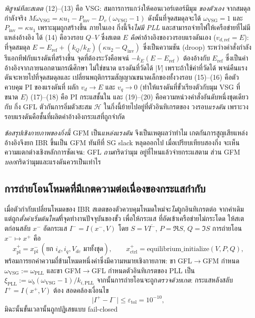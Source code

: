 \documentclass[12pt,a4paper]{article}
\begin{document}
\emph{พิสูจน์ทีละสเตต} (12)--(13) คือ VSG: สมการการแกว่งให้คอนเวอร์เตอร์มีมุม
\emph{ของตัวเอง} จากสมดุลกำลังจริง $M\dot\omega_{\mathrm{VSG}}
=\kappa u_1-P_{\mathrm{inv}}-D_v(\omega_{\mathrm{VSG}}-1)$ ดังนั้นที่จุดสมดุลจะได้
$\omega_{\mathrm{VSG}}=1$ และ $P_{\mathrm{inv}}=\kappa u_1$ เพราะมุมถูกสร้างขึ้น
ภายในเอง กิ่งนี้จึง\emph{ไม่มี PLL} และสามารถจ่ายไฟให้เครือข่ายที่ไม่มีแหล่งอ้างอิง
ได้ (14) คือวงรอบ $Q$--$V$ ซึ่งสเตต $E$ \emph{คือ}ค่าอ้างอิงของวงรอบแรงดันเอง
($v_{d,\mathrm{ref}}=E$): ที่จุดสมดุล $E=E_{\mathrm{ref}}
+(k_Q/k_E)(\kappa u_2-Q_{\mathrm{inv}})$ ซึ่งเป็นความชัน (droop) ระหว่างค่าสั่งกำลัง
รีแอกทีฟกับแรงดันที่สร้างขึ้น จุดที่ต้องระวังคือพจน์ $-k_E(E-E_{\mathrm{ref}})$
ต้องอ้างกับ $E_{\mathrm{ref}}$ ซึ่งเป็นค่าอ้างอิงจากภายนอกตามกรณีศึกษา ไม่ใช่ขนาด
แรงดันที่วัดได้ $|V|$ เพราะถ้าใช้ค่าที่วัดได้ พจน์คืนแรงดันจะหายไปที่จุดสมดุลและ
เปลี่ยนพฤติกรรมสัญญาณขนาดเล็กของทั้งวงรอบ (15)--(16) คือตัวควบคุม PI ของแรงดันที่
ผลัก $v_d\to E$ และ $v_q\to 0$ (ทำให้แรงดันที่ขั้วเรียงตัวกับมุม VSG ที่ขนาด $E$)
(17)--(18) คือ PI กระแสชั้นใน และ (19)--(20) คือความหน่วงคำสั่งอันดับหนึ่งชุดเดียวกับ
กิ่ง GFL ตัวกันการอิ่มตัวสะสม $\mathcal H$ ในกิ่งนี้ย้ายไปอยู่ที่ตัวอินทิเกรตของ
วงรอบ\emph{แรงดัน} เพราะวงรอบแรงดันคือชั้นที่ผลิตค่าอ้างอิงกระแสที่ถูกจำกัด

\emph{ข้อสรุปเชิงกายภาพของกิ่งนี้} GFM เป็น\emph{แหล่งแรงดัน} จึงเป็นเหตุผลว่าทำไม
เกตกันการสูญเสียแหล่งอ้างอิงจึงยก IBR ขึ้นเป็น GFM ทันทีที่ SG slack หลุดออกไป
เมื่อเปรียบเทียบสองกิ่ง จะเห็นความแตกต่างเชิงหลักการชัดเจน: GFL \emph{ถาม}กริดว่ามุม
อยู่ที่ไหนแล้วจ่ายกระแสตาม ส่วน GFM \emph{บอก}กริดว่ามุมและแรงดันควรเป็นเท่าไร

\subsection{การถ่ายโอนโหมดที่มีเกตความต่อเนื่องของกระแสกำกับ}\label{sec:transfer}
เมื่อตัวกำกับเปลี่ยนโหมดของ IBR สเตตของตัวควบคุมโหมดใหม่จะ\emph{ไม่}ถูกอินทิเกรตต่อ
จากค่าเดิม แต่ถูก\emph{ตั้งค่าเริ่มต้นใหม่}ที่จุดทำงานปัจจุบันของขั้ว เพื่อให้กระแส
ที่อัดเข้าเครือข่ายไม่กระโดด ให้สเตตก่อนสลับ $x^{-}$ อัดกระแส $I^{-}=I(x^{-},V)$
โดย $S=V\overline{I^{-}}$, $P=\Re S$, $Q=\Im S$ การถ่ายโอน $x^{-}\mapsto x^{+}$ คือ
\begin{equation}
  x^{+}_{\mathrm{pl}}=x^{-}_{\mathrm{pl}}\ (\text{ยก }i_d,i_q,V_{dc}\text{ มาทั้งชุด}),\qquad
  x^{+}_{\mathrm{ctrl}}=\text{equilibrium\_initialize}(V,P,Q),
  \label{eq:transfer}
\end{equation}
พร้อมการยกค่าความถี่ข้ามโหมดหนึ่งค่าซึ่งมีความหมายเชิงกายภาพ: ขา
GFL$\to$GFM กำหนด $\omega_{\mathrm{VSG}}\!:=\!\omega_{\mathrm{PLL}}$ และขา
GFM$\to$GFL กำหนดตัวอินทิเกรตของ PLL เป็น
$\xi_{\mathrm{PLL}}\!:=\!\omega_b(\omega_{\mathrm{VSG}}-1)/k_{i,\mathrm{PLL}}$
จากนั้นการถ่ายโอนจะถูก\emph{ตรวจด้วยเกต}: กระแสหลังสลับ $I^{+}=I(x^{+},V)$ ต้อง
สอดคล้องเงื่อนไข
\begin{equation}
  \bigl|I^{+}-I^{-}\bigr|\le\varepsilon_{\mathrm{tol}}=10^{-10},
  \label{eq:contgate}
\end{equation}
มิฉะนั้นขั้นเวลานั้นถูกปฏิเสธแบบ fail-closed
\end{document}
